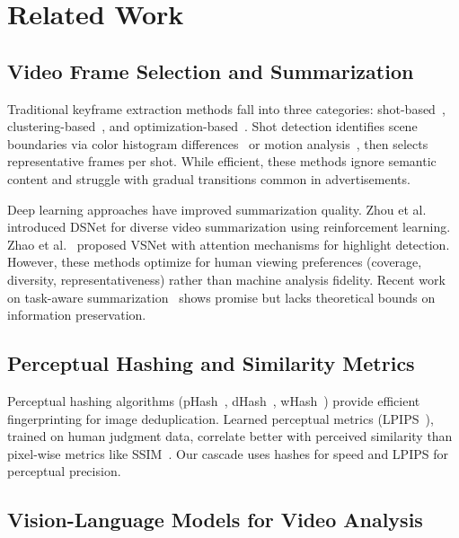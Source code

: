 \section{Related Work}
\label{sec:related_work}

\subsection{Video Frame Selection and Summarization}

Traditional keyframe extraction methods fall into three categories: shot-based~\cite{potapov2014category}, clustering-based~\cite{hanjalic2004unified}, and optimization-based~\cite{das2011video}. Shot detection identifies scene boundaries via color histogram differences~\cite{cernekova2006entropy} or motion analysis~\cite{trivedi2007multi}, then selects representative frames per shot. While efficient, these methods ignore semantic content and struggle with gradual transitions common in advertisements.

Deep learning approaches have improved summarization quality. Zhou et al.~\cite{zhou2018deep} introduced DSNet for diverse video summarization using reinforcement learning. Zhao et al.~\cite{zhao2021video} proposed VSNet with attention mechanisms for highlight detection. However, these methods optimize for human viewing preferences (coverage, diversity, representativeness) rather than machine analysis fidelity. Recent work on task-aware summarization~\cite{rochan2023task} shows promise but lacks theoretical bounds on information preservation.

\subsection{Perceptual Hashing and Similarity Metrics}

Perceptual hashing algorithms (pHash~\cite{zauner2010framework}, dHash~\cite{krawczyk2015phash}, wHash~\cite{wang2019robust}) provide efficient fingerprinting for image deduplication. Learned perceptual metrics (LPIPS~\cite{zhang2018unreasonable}), trained on human judgment data, correlate better with perceived similarity than pixel-wise metrics like SSIM~\cite{wang2004image}. Our cascade uses hashes for speed and LPIPS for perceptual precision.

\subsection{Vision-Language Models for Video Analysis}

